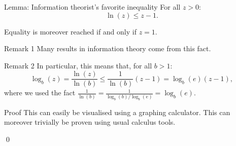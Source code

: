 \documentclass[a4paper]{article}
\begin{document}
\begin{parag}{Lemma: Information theorist’s favorite inequality}
    For all $z > 0$: 
    \[\ln\left(z\right) \leq z - 1.\]

    Equality is moreover reached if and only if $z = 1$.

    \begin{subparag}{Remark 1}
        Many results in information theory come from this fact.
    \end{subparag}

    \begin{subparag}{Remark 2}
        In particular, this means that, for all $b > 1$: 
        \[\log_b\left(z\right) = \frac{\ln\left(z\right)}{\ln\left(b\right)} \leq \frac{1}{\ln\left(b\right)} \left(z - 1\right) = \log_{b}\left(e\right)\left(z - 1\right),\]
        where we used the fact $\frac{1}{\ln\left(b\right)} = \frac{1}{\log_{b}\left(b\right) / \log_{b}\left(e\right)} = \log_{b}\left(e\right)$.
    \end{subparag}

    \begin{subparag}{Proof}
        This can easily be visualised using a graphing calculator. This can moreover trivially be proven using usual calculus tools.

        \qed
    \end{subparag}
\end{parag}
\end{document}
